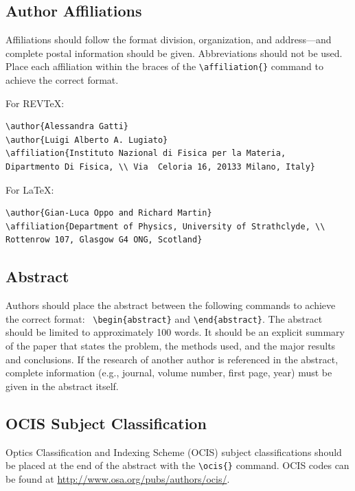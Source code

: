 \documentclass[letterpaper,11pt]{article}   %
\begin{document}
\subsection{Author Affiliations}
Affiliations should follow the format division, organization, and
address---and complete postal information should be given.
Abbreviations should not be used. Place each affiliation within
the braces of the \verb+\affiliation{}+ command to achieve the
correct format.

\bigskip

For REV\TeX:
\begin{verbatim}
\author{Alessandra Gatti}
\author{Luigi Alberto A. Lugiato}
\affiliation{Instituto Nazional di Fisica per la Materia,
Dipartmento Di Fisica, \\ Via  Celoria 16, 20133 Milano, Italy}
\end{verbatim}

\bigskip

For \LaTeX:
\begin{verbatim}
\author{Gian-Luca Oppo and Richard Martin}
\affiliation{Department of Physics, University of Strathclyde, \\
Rottenrow 107, Glasgow G4 ONG, Scotland}
\end{verbatim}

\subsection{Abstract} Authors should place the abstract between
the following commands to achieve the correct format: \
\verb+\begin{abstract}+ and \verb+\end{abstract}+. The abstract
should be limited to approximately 100 words. It should be an
explicit summary of the paper that states the problem, the methods
used, and the major results and conclusions. If the research of
another author is referenced in the abstract, complete information
(e.g., journal, volume number, first page, year) must be
given in the abstract itself.

\subsection{OCIS Subject Classification} Optics Classification and
Indexing Scheme (OCIS) subject classifications should be placed at
the end of the abstract with the \verb+\ocis{}+ command. OCIS
codes can be found at \href{http://www.osa.org/pubs/authors/ocis/}{http://www.osa.org/pubs/authors/ocis/}.
\end{document}
